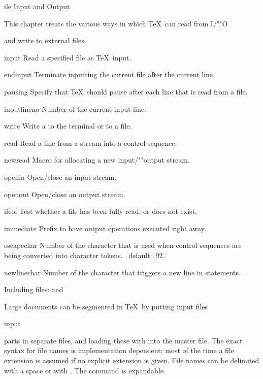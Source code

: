 \subject[io]  File Input and Output

This chapter treats the various ways in which \TeX\ can read from
\term I/""O\par
and write to external files.

\invent
\item input 
      Read a specified file as \TeX\ input. 

\item endinput 
      Terminate inputting the current file after the current line.

\item pausing 
      Specify that \TeX\ should pause after each line that is 
      read from a file.

\item inputlineno 
      Number of the current input line.


\item write   
      Write a  to the terminal or to a file. 

\item read   
      Read a line from a stream into a control sequence.

\item newread 
      Macro for allocating a new input/""output stream.

\item openin 
      Open/close an input stream.

\item openout 
      Open/close an output stream.

\item ifeof  
      Test whether a file has been fully read, or does not exist.

\item immediate  
      Prefix to have output operations executed right away.

\item escapechar 
      Number of the character that is  used 
      when control sequences are being converted
      into character tokens.
      \IniTeX\ default:~92.

\item newlinechar 
      Number of the character that triggers a new line in
       statements.

\inventstop


\point Including files: \cs{} and \cs{\endinput}

Large documents can be segmented in \TeX\ by putting 
\term input files\par\csterm input\par
parts in separate files, and loading these with 
into the master file. The exact syntax for
file names is implementation dependent; most of the
time a  file extension is assumed if no explicit
extension is given.
File names can be delimited with a space or with .
The  command is expandable.

